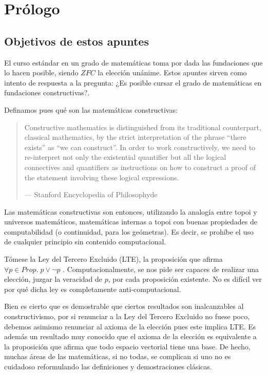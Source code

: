 \chapter{Prólogo}

\section{Objetivos de estos apuntes}

El curso estándar en un grado de matemáticas toma por dada las fundaciones que lo hacen posible, siendo $ ZFC $ la elección unánime. Estos apuntes sirven como intento de respuesta a la pregunta: ¿Es posible cursar el grado de matemáticas en fundaciones constructivas?.

Definamos pues qué son las matemáticas constructivas:

\begin{quote}
Constructive mathematics is distinguished from its traditional counterpart, classical mathematics, by the strict interpretation of the phrase ``there exists'' as ``we can construct''. In order to work constructively, we need to re-interpret not only the existential 
quantifier but all the logical connectives and quantifiers as instructions on how to construct a proof of the statement involving these logical expressions. 

--- Stanford Encyclopedia of Philosophyde 
\end{quote}

Las matemáticas constructivas son entonces, utilizando la analogía entre topoi y universos matemáticos, matemáticas internas a topoi con buenas propiedades de computabilidad (o continuidad, para los geómetras). Es decir, se prohíbe el uso de cualquier principio 
sin contenido computacional.

Tómese la Ley del Tercero Excluido (LTE), la proposición que afirma $ \forall p \in Prop.\; p \vee \neg p $ . Computacionalmente, se nos pide ser capaces de realizar una elección, juzgar la veracidad de $ p $, por cada proposición existente. No es difícil ver por
qué dicha ley es completamente anti-computacional.

Bien es cierto que es demostrable que ciertos resultados son inalcanzables al constructivismo, por si renunciar a la Ley del Tercero Excluido no fuese poco, debemos asimismo renunciar al axioma de la elección pues este implica LTE. Es además un resultado muy conocido
que el axioma de la elección es equivalente a la proposición que afirma que todo espacio vectorial tiene una base. De hecho, muchas áreas de las matemáticas, si no todas, se complican si uno no es cuidadoso reformulando las definiciones y demostraciones clásicas.

